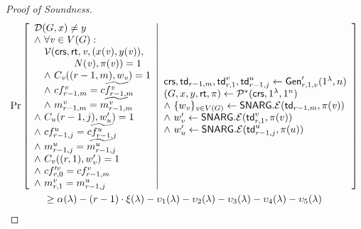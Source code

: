 \begin{proof}[Proof of Soundness]
\begin{gather*}
    \Pr \left[ \begin{array}{ll} 
    \mathcal{D}(G, x)\neq y  \\
    \wedge\ \forall \mathit{ v }\in V(G) : \\
    \quad \mathcal{V}(\mathsf{crs}, \mathsf{rt}, \mathit{ v }, (x(\mathit{ v }), y(\mathit{ v })),\\
    \qquad \qquad N(\mathit{ v }), \pi(\mathit{ v })) = 1 \\
    \quad \wedge ~C_{\mathit{ v }}((r-1, m), w_{\mathit{ v }}) = 1 \\
    \quad \wedge ~cf^{\mathit{ v }}_{r-1, m} = \widetilde{cf^{\mathit{ v }}_{r-1,m}} \\
    \quad \wedge ~m^{\mathit{ v }}_{r-1,m} = \widetilde{m^{\mathit{ v }}_{r-1,m}} \\
    \wedge ~C_{u}(r-1,j),w'_{u}) = 1 \\
    \wedge ~cf^u_{r-1,j} = \widetilde{cf^u_{r-1,j}} \\
    \wedge ~m^u_{r-1,j} = \widetilde{m^u_{r-1,j}} \\
    \wedge ~C_v((r,1),w'_v) = 1 \\
    \wedge ~cf'^v_{r,0} = cf^v_{r-1,m} \\
    \wedge ~m^v_{r,1} = m^u_{r-1,j}
     \end{array} \middle\vert \begin{array}{ll} 
    \mathsf{crs}, \mathsf{td}_{r-1,m}, \mathsf{td}^v_{r,1}, \mathsf{td}^{u}_{r-1, j}\leftarrow \mathsf{Gen}'_{r,1,v}(1^\lambda, n) \\
    (G, x, y, \mathsf{rt}, \pi) \leftarrow \mathcal{P}^*(\mathsf{crs}, 1^\lambda, 1^n)\\
    \wedge ~\{w_{\mathit{ v }}\}_{\mathit{ v }\in V(G)}\leftarrow \mathsf{SNARG}.\mathcal{E}(\mathsf{td}_{r-1,m}, \pi(\mathit{ v })) \\
    \wedge ~w'_v\leftarrow \mathsf{SNARG}.\mathcal{E}(\mathsf{td}^v_{r,1}, \pi(v)) \\
    \wedge ~w'_{u}\leftarrow \mathsf{SNARG}.\mathcal{E}(\mathsf{td}^{u}_{r-1,j}, \pi(u))
     \end{array} \right]\\
    \geq \alpha(\lambda) - (r-1)\cdot\xi(\lambda) - \upsilon_1(\lambda) - \upsilon_2(\lambda) - \upsilon_3(\lambda) - \upsilon_4(\lambda) - \upsilon_5(\lambda)
\end{gather*}


\end{proof}
